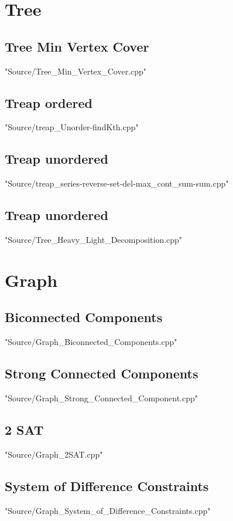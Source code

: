 \documentclass [12pt,twocolumn,oneside]{article}
\begin{document}
\newpage
\section{Tree}
\subsection{Tree Min Vertex Cover}
 {"Source/Tree_Min_Vertex_Cover.cpp"}

\subsection{Treap ordered}
 {"Source/treap_Unorder-findKth.cpp"}

\subsection{Treap unordered}
 {"Source/treap_series-reverse-set-del-max_cont_sum-sum.cpp"}

\subsection{Treap unordered}
 {"Source/Tree_Heavy_Light_Decomposition.cpp"}




\newpage
\section{Graph}
\subsection{Biconnected Components}
 {"Source/Graph_Biconnected_Components.cpp"}

\subsection{Strong Connected Components}
 {"Source/Graph_Strong_Connected_Component.cpp"}

\subsection{2 SAT}
 {"Source/Graph_2SAT.cpp"}

\subsection{System of Difference Constraints}
 {"Source/Graph_System_of_Difference_Constraints.cpp"}
\end{document}
